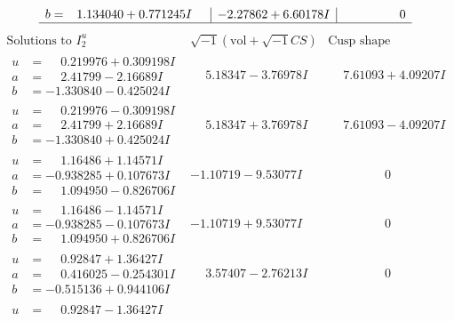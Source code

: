 \documentclass[1p]{elsarticle_modified}
\theoremstyle{definition}
\newcommand{\I}{\sqrt{-1}}
\begin{document}
$$\begin{array}{c|c|c}
\begin{aligned}
b &= \phantom{-}1.134040 + 0.771245 I\end{aligned}
 & -2.27862 + 6.60178 I & \phantom{-0.000000 } 0\\
 \hline 
 \end{array}$$\newpage$$\begin{array}{c|c|c}  
\text{Solutions to }I^u_{2}& \I (\text{vol} + \sqrt{-1}CS) & \text{Cusp shape}\\
 \hline 
\begin{aligned}
u &= \phantom{-}0.219976 + 0.309198 I \\
a &= \phantom{-}2.41799 - 2.16689 I \\
b &= -1.330840 - 0.425024 I\end{aligned}
 & \phantom{-}5.18347 - 3.76978 I & \phantom{-}7.61093 + 4.09207 I \\ \hline\begin{aligned}
u &= \phantom{-}0.219976 - 0.309198 I \\
a &= \phantom{-}2.41799 + 2.16689 I \\
b &= -1.330840 + 0.425024 I\end{aligned}
 & \phantom{-}5.18347 + 3.76978 I & \phantom{-}7.61093 - 4.09207 I \\ \hline\begin{aligned}
u &= \phantom{-}1.16486 + 1.14571 I \\
a &= -0.938285 + 0.107673 I \\
b &= \phantom{-}1.094950 - 0.826706 I\end{aligned}
 & -1.10719 - 9.53077 I & \phantom{-0.000000 } 0 \\ \hline\begin{aligned}
u &= \phantom{-}1.16486 - 1.14571 I \\
a &= -0.938285 - 0.107673 I \\
b &= \phantom{-}1.094950 + 0.826706 I\end{aligned}
 & -1.10719 + 9.53077 I & \phantom{-0.000000 } 0 \\ \hline\begin{aligned}
u &= \phantom{-}0.92847 + 1.36427 I \\
a &= \phantom{-}0.416025 - 0.254301 I \\
b &= -0.515136 + 0.944106 I\end{aligned}
 & \phantom{-}3.57407 - 2.76213 I & \phantom{-0.000000 } 0 \\ \hline\begin{aligned}
u &= \phantom{-}0.92847 - 1.36427 I \\

\end{aligned}
\end{array}$$
\end{document}

